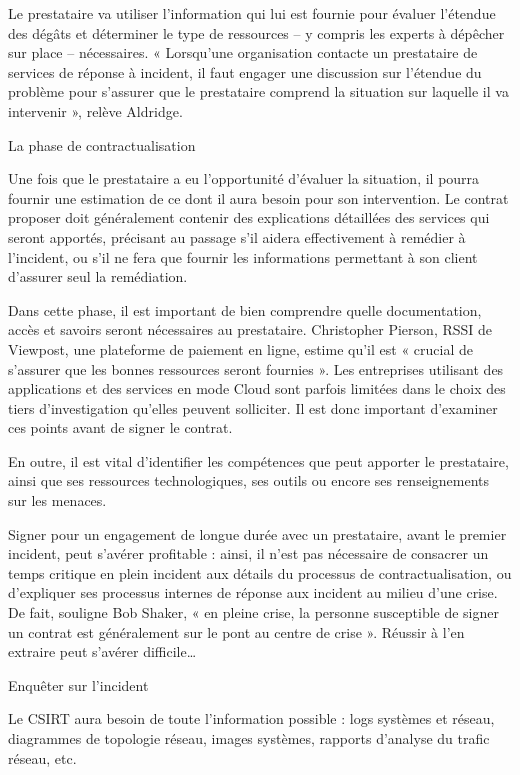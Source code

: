 Le prestataire va utiliser l’information qui lui est fournie pour évaluer l’étendue des dégâts et déterminer le type de ressources – y compris les experts à dépêcher sur place – nécessaires. « Lorsqu’une organisation contacte un prestataire de services de réponse à incident, il faut engager une discussion sur l’étendue du problème pour s’assurer que le prestataire comprend la situation sur laquelle il va intervenir », relève Aldridge.

La phase de contractualisation

Une fois que le prestataire a eu l’opportunité d’évaluer la situation, il pourra fournir une estimation de ce dont il aura besoin pour son intervention. Le contrat proposer doit généralement contenir des explications détaillées des services qui seront apportés, précisant au passage s’il aidera effectivement à remédier à l’incident, ou s’il ne fera que fournir les informations permettant à son client d’assurer seul la remédiation.

Dans cette phase, il est important de bien comprendre quelle documentation, accès et savoirs seront nécessaires au prestataire. Christopher Pierson, RSSI de Viewpost, une plateforme de paiement en ligne, estime qu’il est « crucial de s’assurer que les bonnes ressources seront fournies ». Les entreprises utilisant des applications et des services en mode Cloud sont parfois limitées dans le choix des tiers d’investigation qu’elles peuvent solliciter. Il est donc important d’examiner ces points avant de signer le contrat.

En outre, il est vital d’identifier les compétences que peut apporter le prestataire, ainsi que ses ressources technologiques, ses outils ou encore ses renseignements sur les menaces.

Signer pour un engagement de longue durée avec un prestataire, avant le premier incident, peut s’avérer profitable : ainsi, il n’est pas nécessaire de consacrer un temps critique en plein incident aux détails du processus de contractualisation, ou d’expliquer ses processus internes de réponse aux incident au milieu d’une crise. De fait, souligne Bob Shaker, « en pleine crise, la personne susceptible de signer un contrat est généralement sur le pont au centre de crise ». Réussir à l’en extraire peut s’avérer difficile…

Enquêter sur l’incident

Le CSIRT aura besoin de toute l’information possible : logs systèmes et réseau, diagrammes de topologie réseau, images systèmes, rapports d’analyse du trafic réseau, etc.

